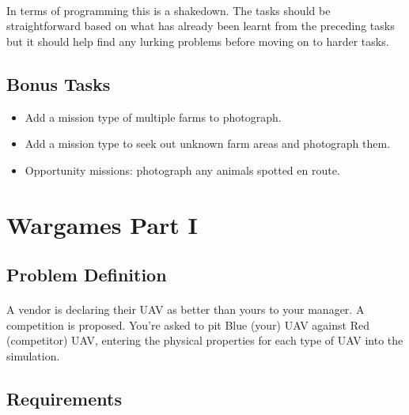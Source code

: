 \documentclass[11pt]{book}
\begin{document}
\paragraph{} In terms of programming this is a shakedown. The tasks should be straightforward based on what has already been learnt from the preceding tasks but it should help find any lurking problems before moving on to harder tasks.

\subsection{Bonus Tasks}

\begin{itemize}
\item Add a mission type of multiple farms to photograph.
\item Add a mission type to seek out unknown farm areas and photograph them.
\item Opportunity missions: photograph any animals spotted en route.
\end{itemize}

\clearpage



\section{Wargames Part I}

\subsection{Problem Definition}

\paragraph{} A vendor is declaring their UAV as better than yours to your manager. A competition is proposed. You're asked to pit Blue (your) UAV against Red (competitor) UAV, entering the physical properties for each type of UAV into the simulation.

\subsection{Requirements}
\end{document}
